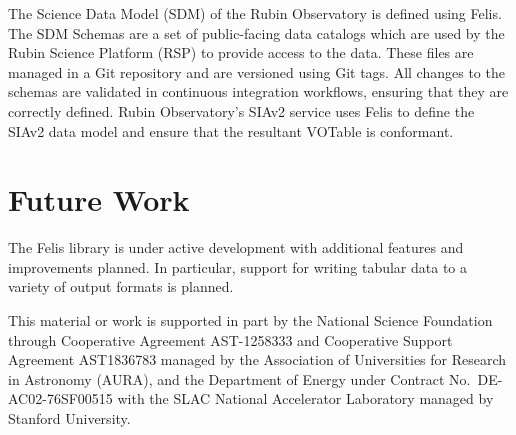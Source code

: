 \documentclass[11pt,twoside]{article}
\begin{document}
The Science Data Model (SDM) of the Rubin Observatory \citep[e.g.,][]{LSE-163} is defined using Felis.
The SDM Schemas are a set of public-facing data catalogs which are used by the Rubin Science Platform (RSP) to provide access to the data.
These files are managed in a Git repository and are versioned using Git tags.
All changes to the schemas are validated in continuous integration workflows, ensuring that they are correctly defined.
Rubin Observatory's SIAv2 service \citep{P920_adassxxxiv} uses Felis to define the SIAv2 data model and ensure that the resultant VOTable is conformant.

\section{Future Work}

The Felis library is under active development with additional features and improvements planned.
In particular, support for writing tabular data to a variety of output formats is planned.

\acknowledgments This material or work is supported in part by the National Science Foundation through Cooperative Agreement AST-1258333 and Cooperative Support Agreement AST1836783 managed by the Association of Universities for Research in Astronomy (AURA), and the Department of Energy under Contract No.\ DE-AC02-76SF00515 with the SLAC National Accelerator Laboratory managed by Stanford University.


\end{document}
